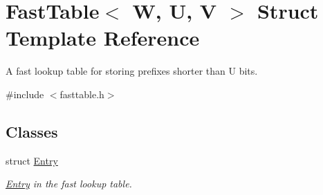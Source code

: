 \hypertarget{structFastTable}{\section{Fast\-Table$<$ W, U, V $>$ Struct Template Reference}
\label{structFastTable}
}


A fast lookup table for storing prefixes shorter than U bits.  




{\ttfamily \#include $<$fasttable.\-h$>$}

\subsection*{Classes}
\begin{DoxyCompactItemize}
\item 
struct \hyperlink{structFastTable_1_1Entry}{Entry}
\begin{DoxyCompactList}\small\item\em \hyperlink{structFastTable_1_1Entry}{Entry} in the fast lookup table. \end{DoxyCompactList}\end{DoxyCompactItemize}
